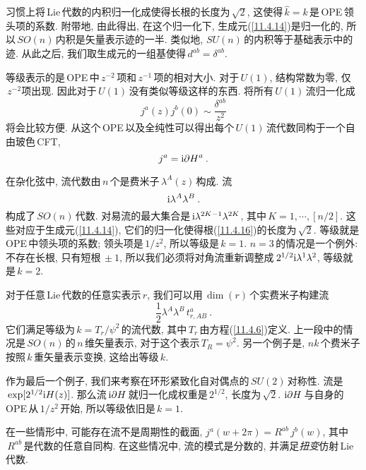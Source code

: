 习惯上将\,Lie\,代数的内积归一化成使得长根的长度为$\,\sqrt{2}$, 这使得$\,\hat{k}=k\,$是\,OPE\,领头项的系数. 附带地, 由此得出, 在这个归一化下, 生成元(\ref{11.4.14})是归一化的, 所以$\,SO(n)\,$内积是矢量表示迹的一半. 类似地, $SU(n)$\,的内积等于基础表示中的迹. 从此之后, 我们取生成元的一组基使得$\,d^{ab}=\delta^{ab}$.


等级表示的是\,OPE\,中$\,z^{-2}\,$项和$\,z^{-1}\,$项的相对大小. 对于$\,U(1)$, 结构常数为零, 仅$\,z^{-2}$项出现. 因此对于$\,U(1)\,$没有类似等级这样的东西. 将所有\,$U(1)\,$流归一化成
\begin{equation}
    j^{a}(z)j^{b}(0) \sim \frac{\delta^{ab}}{z^{2}} \label{11.5.14}
\end{equation}
将会比较方便. 从这个\,OPE\,以及全纯性可以得出每个$\,U(1)\,$流代数同构于一个自由玻色\,CFT,
\begin{equation}
    j^{a}=\mathrm{i}\partial H^{a} \:. \label{11.5.15}
\end{equation}

在杂化弦中, 流代数由$\,n\,$个是费米子$\,\lambda^{A}(z)\,$构成. 流
\begin{equation}
\mathrm{i}\lambda^{A}\lambda^{B} \:. \label{11.5.16}
\end{equation}
构成了$\,SO(n)\,$代数. 对易流的最大集合是$\,\mathrm{i}\lambda^{2K-1}\lambda^{2K}$, 其中$\,K=1,\cdots,[n/2]$. 这些对应于生成元(\ref{11.4.14}), 它们的归一化使得根(\ref{11.4.16})的长度为$\,\sqrt{2}$. 等级就是\,OPE\,中领头项的系数; 领头项是$\,1/z^{2}$, 所以等级是$\,k=1$. $n=3\,$的情况是一个例外: 不存在长根, 只有短根$\,\pm1$, 所以我们必须将对角流重新调整成$\,2^{1/2}\mathrm{i}\lambda^{1}\lambda^{2}$, 等级就是$\,k=2$.

对于任意\,Lie\,代数的任意实表示$\,r$, 我们可以用$\,\operatorname{dim}(r)\,$个实费米子构建流
\begin{equation}
    \frac{1}{2}\lambda^{A}\lambda^{B}\,t_{r,AB}^{a} \:. \label{11.5.17}
\end{equation}
它们满足等级为$\,k=T_{r}/\psi^{2}\,$的流代数, 其中$\,T_{r}\,$由方程(\ref{11.4.6})定义. 上一段中的情况是$\,SO(n)\,$的$\,n\,$维矢量表示, 对于这个表示$\,T_{R}=\psi^{2}$. 另一个例子是, $nk\,$个费米子按照$\,k\,$重矢量表示变换, 这给出等级$\,k$.

作为最后一个例子, 我们来考察在环形紧致化自对偶点的$\,SU(2)\,$对称性. 流是$\,\exp[2^{1/2}\mathrm{i} H(z)]$. 那么流$\,\mathrm{i}\partial H\,$就归一化成权重是$\,2^{1/2}$, 长度为$\,\sqrt{2}$. $\mathrm{i}\partial H\,$与自身的\,OPE\,从$\,1/z^{2}\,$开始, 所以等级依旧是$\,k=1$.

在一些情形中, 可能存在流不是周期性的截面, $j^{a}(w+2\pi)=R^{ab}\,j^{b}(w)$, 其中$\,R^{ab}\,$是代数的任意自同构. 在这些情况中, 流的模式是分数的, 并满足{\emph{扭变}}仿射\,Lie\,代数.

